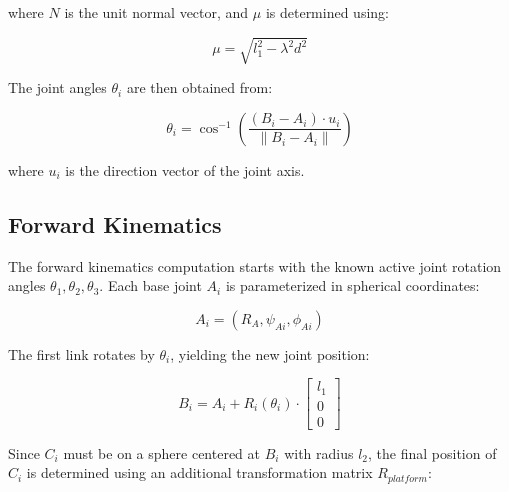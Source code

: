 \documentclass[letterpaper, 10 pt, conference]{ieeeconf}  %
\begin{document}
where $N$ is the unit normal vector, and $\mu$ is determined using:

\begin{equation}
\mu = \sqrt{l_1^2 - \lambda^2 d^2}
\end{equation}

The joint angles $\theta_i$ are then obtained from:

\begin{equation}
\theta_i = \cos^{-1} \left( \frac{(B_i - A_i) \cdot u_i}{\|B_i - A_i\|} \right)
\end{equation}

where $u_i$ is the direction vector of the joint axis.

\subsection{Forward Kinematics}
The forward kinematics computation starts with the known active joint rotation angles $\theta_1, \theta_2, \theta_3$. Each base joint $A_i$ is parameterized in spherical coordinates:

\begin{equation}
A_i = (R_A, \psi_{Ai}, \phi_{Ai})
\end{equation}

The first link rotates by $\theta_i$, yielding the new joint position:

\begin{equation}
B_i = A_i + R_i(\theta_i) \cdot 
\begin{bmatrix}
l_1 \\ 0 \\ 0
\end{bmatrix}
\end{equation}

Since $C_i$ must be on a sphere centered at $B_i$ with radius $l_2$, the final position of $C_i$ is determined using an additional transformation matrix $R_{platform}$:
\end{document}
